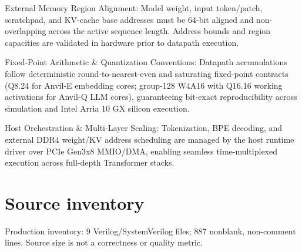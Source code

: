 \documentclass[11pt,a4paper]{article}
\begin{document}
External Memory Region Alignment: Model weight,\allowbreak{} input token/\allowbreak{}patch,\allowbreak{} scratchpad,\allowbreak{} and KV-cache base addresses must be 64-bit aligned and non-overlapping across the active sequence length. Address bounds and region capacities are validated in hardware prior to datapath execution.


Fixed-Point Arithmetic \& Quantization Conventions: Datapath accumulations follow deterministic round-to-nearest-even and saturating fixed-point contracts (\allowbreak{}Q8.24 for Anvil-E embedding cores; group-128 W4A16 with Q16.16 working activations for Anvil-Q LLM cores)\allowbreak{},\allowbreak{} guaranteeing bit-exact reproducibility across simulation and Intel Arria 10 GX silicon execution.


Host Orchestration \& Multi-Layer Scaling: Tokenization,\allowbreak{} BPE decoding,\allowbreak{} and external DDR4 weight/\allowbreak{}KV address scheduling are managed by the host runtime driver over PCIe Gen3x8 MMIO/\allowbreak{}DMA,\allowbreak{} enabling seamless time-multiplexed execution across full-depth Transformer stacks.


\appendix{}\section{Source inventory}

Production inventory: 9 Verilog/\allowbreak{}SystemVerilog files; 887 nonblank,\allowbreak{} non-comment lines. Source size is not a correctness or quality metric.
\end{document}
